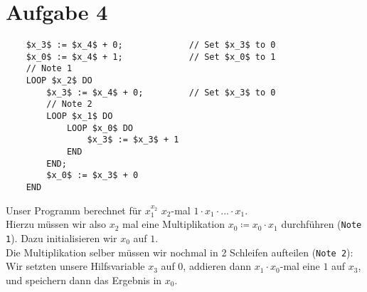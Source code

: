 \documentclass[a4paper,11pt]{scrartcl}
\begin{document}
	\section*{Aufgabe 4}
	\begin{lstlisting}
	$x_3$ := $x_4$ + 0;				// Set $x_3$ to 0
	$x_0$ := $x_4$ + 1;				// Set $x_0$ to 1
	// Note 1
	LOOP $x_2$ DO
		$x_3$ := $x_4$ + 0; 		// Set $x_3$ to 0
		// Note 2	
		LOOP $x_1$ DO
			LOOP $x_0$ DO
				$x_3$ := $x_3$ + 1
			END
		END;
		$x_0$ := $x_3$ + 0
	END
	\end{lstlisting}
	Unser Programm berechnet für $x_1^{x_2}$ $x_2$-mal $1 \cdot x_1 \cdot ... \cdot x_1$.\\
	Hierzu müssen wir also $x_2$ mal eine Multiplikation $x_0 \coloneqq x_0 \cdot x_1$ durchführen (\verb|Note 1|). Dazu initialisieren wir $x_0$ auf $1$.\\
	Die Multiplikation selber müssen wir nochmal in 2 Schleifen aufteilen (\verb|Note 2|): Wir setzten unsere Hilfsvariable $x_3$ auf $0$, addieren dann $x_1 \cdot x_0$-mal eine $1$ auf $x_3$, und speichern dann das Ergebnis in $x_0$.
	
	
\end{document}
